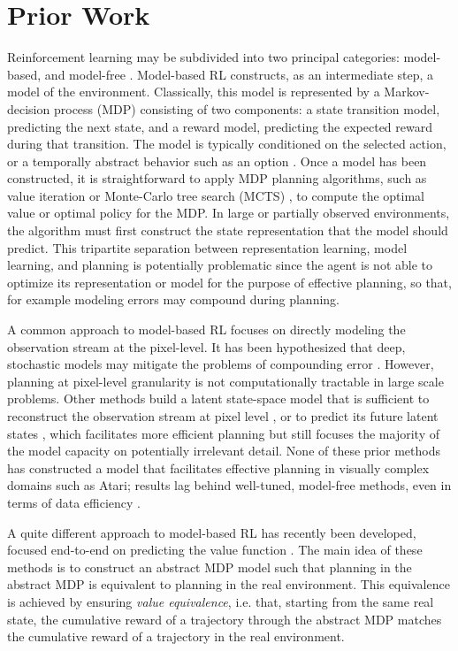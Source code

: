 \documentclass{article}
\begin{document}
\section{Prior Work}

Reinforcement learning may be subdivided into two principal categories: model-based, and model-free \cite{sutton:book}. Model-based RL constructs, as an intermediate step, a model of the environment. Classically, this model is represented by a Markov-decision process (MDP) \cite{puterman:MDP} consisting of two components: a state transition model, predicting the next state, and a reward model, predicting the expected reward during that transition. The model is typically conditioned on the selected action, or a temporally abstract behavior such as an option \cite{sutton:between}. Once a model has been constructed, it is straightforward to apply MDP planning algorithms, such as value iteration \cite{puterman:MDP} or Monte-Carlo tree search (MCTS) \cite{coulom:mcts}, to compute the optimal value or optimal policy for the MDP. In large or partially observed environments, the algorithm must first construct the state representation that the model should predict. This tripartite separation between representation learning, model learning, and planning is potentially problematic since the agent is not able to optimize its representation or model for the purpose of effective planning, so that, for example modeling errors may compound during planning.

A common approach to model-based RL focuses on directly modeling the observation stream at the pixel-level. It has been hypothesized that deep, stochastic models may mitigate the problems of compounding error \cite{hafner:planet, kaiser:simple}. However, planning at pixel-level granularity is not computationally tractable in large scale problems. Other methods build a latent state-space model that is sufficient to reconstruct the observation stream at pixel level \cite{wahlstrom:pixels_to_torques,watter:embed_to_control}, or to predict its future latent states \cite{ha:world_model,gelada:deepmdp}, which facilitates more efficient planning but still focuses the majority of the model capacity on potentially irrelevant detail. None of these prior methods has constructed a model that facilitates effective planning in visually complex domains such as Atari; results lag behind well-tuned, model-free methods, even in terms of data efficiency \cite{hado:replay}.

A quite different approach to model-based RL has recently been developed, focused end-to-end on predicting the value function \cite{silver:predictron}. The main idea of these methods is to construct an abstract MDP model such that planning in the abstract MDP is equivalent to planning in the real environment. This equivalence is achieved by ensuring \emph{value equivalence}, i.e. that, starting from the same real state, the cumulative reward of a trajectory through the abstract MDP matches the cumulative reward of a trajectory in the real environment.
\end{document}

